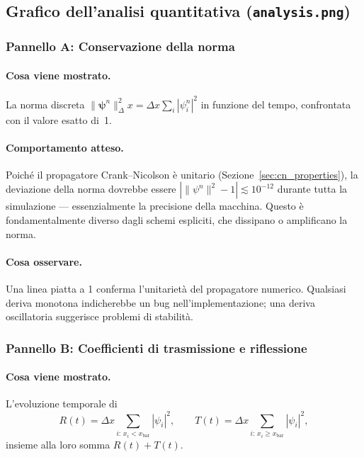 \documentclass[12pt, a4paper]{article}
\newcommand{\dx}{\Delta x}
\newcommand{\CN}{Crank--Nicolson}
\begin{document}
\subsection{Grafico dell'analisi quantitativa (\texttt{analysis.png})}

\subsubsection{Pannello A: Conservazione della norma}

\paragraph{Cosa viene mostrato.}
La norma discreta $\|\boldsymbol{\psi}^n\|^2_\dx = \dx\sum_i |\psi_i^n|^2$
in funzione del tempo, confrontata con il valore esatto di~1.

\paragraph{Comportamento atteso.}
Poiché il propagatore \CN{} è unitario (Sezione~\ref{sec:cn_properties}),
la deviazione della norma dovrebbe essere $|\|\psi^n\|^2 - 1| \lesssim 10^{-12}$
durante tutta la simulazione — essenzialmente la precisione della macchina.
Questo è fondamentalmente diverso dagli schemi espliciti, che dissipano o
amplificano la norma.

\paragraph{Cosa osservare.}
Una linea piatta a 1 conferma l'unitarietà del propagatore numerico.
Qualsiasi deriva monotona indicherebbe un bug nell'implementazione; una
deriva oscillatoria suggerisce problemi di stabilità.

\subsubsection{Pannello B: Coefficienti di trasmissione e riflessione}

\paragraph{Cosa viene mostrato.}
L'evoluzione temporale di
\begin{equation}
  R(t) = \dx\sum_{i:\,x_i < x_\text{bar}} |\psi_i|^2,
  \qquad
  T(t) = \dx\sum_{i:\,x_i \geq x_\text{bar}} |\psi_i|^2,
\end{equation}
insieme alla loro somma $R(t) + T(t)$.
\end{document}
